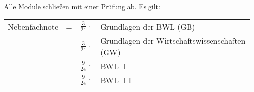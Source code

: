Alle Module schließen mit einer Prüfung ab. Es gilt:\\[0.5ex]
\begin{tabular}{lcrl}
Nebenfachnote & = &$\frac{3}{24}\,\cdot$&Grundlagen der BWL (GB)\\[0.5ex]
              & + &$\frac{3}{24}\,\cdot$&Grundlagen der Wirtschaftswissenschaften (GW)\\[0.5ex]
              & + &$\frac{9}{24}\,\cdot$&BWL~II\\             
              & + &$\frac{9}{24}\,\cdot$&BWL~III
                                  
\end{tabular}


